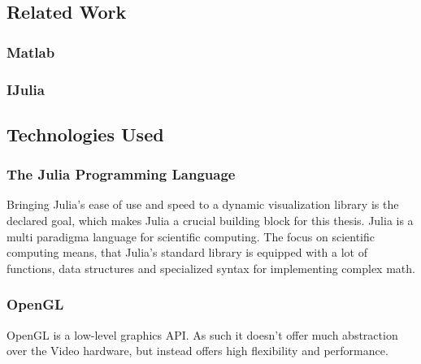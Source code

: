 \subsection{Related Work}

\subsubsection{Matlab}

\subsubsection{IJulia}

\subsection{Technologies Used}


\subsubsection{The Julia Programming Language}
Bringing Julia's ease of use and speed to a dynamic visualization library is the declared goal, which makes Julia a crucial building block for this thesis.
Julia is a multi paradigma language for scientific computing.
The focus on scientific computing means, that Julia's standard library is equipped with a lot of functions, data structures and specialized syntax for implementing complex math.

\subsubsection{OpenGL}
OpenGL is a low-level graphics API. As such it doesn't offer much abstraction over the Video hardware, but instead offers high flexibility and performance.

